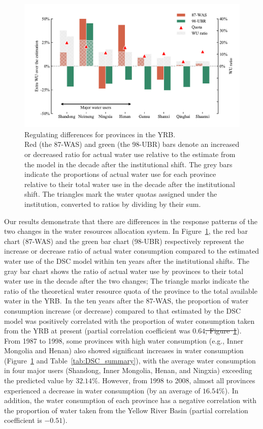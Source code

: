 \documentclass[preprint, 12pt]{elsarticle}
\providecommand{\DIFdeltex}[1]{{\protect\color{red}\sout{#1}}}                      %
\providecommand{\DIFdelbegin}{} %
\providecommand{\DIFdelend}{} %
\providecommand{\DIFdel}[1]{\texorpdfstring{\DIFdeltex{#1}}{}} %
\begin{document}
\begin{figure}[!htb]
	\centering
	\includegraphics[width=0.9\linewidth]{outputs/fig3.pdf}
	\caption{
		Regulating differences for provinces in the YRB.\\
		Red (the 87-WAS) and green (the 98-UBR) bars denote an increased or decreased ratio for actual water use relative to the estimate from the model in the decade after the institutional shift.
		The grey bars indicate the proportions of actual water use for each province relative to their total water use in the decade after the institutional shift.
		The triangles mark the water quotas assigned under the institution, converted to ratios by dividing by their sum.
	}\label{fig:regulating}
\end{figure}

Our results demonstrate that there are differences in the response patterns of the two changes in the water resources allocation system.
In Figure~\ref{fig:regulating}, the red bar chart (87-WAS) and the green bar chart (98-UBR) respectively represent the increase or decrease ratio of actual water consumption compared to the estimated water use of the DSC model within ten years after the institutional shifts.
The gray bar chart shows the ratio of actual water use by provinces to their total water use in the decade after the two changes; The triangle marks indicate the ratio of the theoretical water resource quota of the province to the total available water in the YRB.\
In the ten years after the 87-WAS, the proportion of water consumption increase (or decrease) compared to that estimated by the DSC model was positively correlated with the proportion of water consumption taken from the YRB at present (partial correlation coefficient was $0.64$\DIFdelbegin \DIFdel{, Figure~\ref{fig:regulating}}\DIFdelend ).
From 1987 to 1998, some provinces with high water consumption (e.g., Inner Mongolia and Henan) also showed significant increases in water consumption (Figure~\ref{fig:regulating} and Table~\ref{tab:DSC_summary}), with the average water consumption in four major users (Shandong, Inner Mongolia, Henan, and Ningxia) exceeding the predicted value by $32.14\%$.
However, from 1998 to 2008, almost all provinces experienced a decrease in water consumption (by an average of $16.54\%$).
In addition, the water consumption of each province has a negative correlation with the proportion of water taken from the Yellow River Basin (partial correlation coefficient is $-0.51$).
\end{document}
